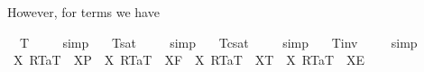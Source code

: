 \begin{isabellebody}
%
\endisadelimproof
%
\begin{isamarkuptext}%
However, for terms we have%
\end{isamarkuptext}%
\isamarkuptrue%
\isamarkupfalse%
\ \ {\isachardoublequoteopen}{\isacharbrackleft}{\isasymphi}\isactrlsup T{\isacharbrackright}\ {\isacharequal}\ {\isacharasterisk}{\isachardoublequoteclose}%
\isadelimproof
\ %
\endisadelimproof
%
\isatagproof
{}\isamarkupfalse%
\ simp\ \isamarkupfalse%
%
\endisatagproof
{\isafoldproof}%
%
\isadelimproof
%
\endisadelimproof
\isanewline
{}\isamarkupfalse%
\ \ {\isachardoublequoteopen}{\isacharbrackleft}{\isasymphi}\isactrlsup T{\isacharbrackright}\isactrlsup s\isactrlsup a\isactrlsup t\ {\isacharequal}\ {\isacharasterisk}{\isachardoublequoteclose}%
\isadelimproof
\ %
\endisadelimproof
%
\isatagproof
{}\isamarkupfalse%
\ simp\ \isamarkupfalse%
%
\endisatagproof
{\isafoldproof}%
%
\isadelimproof
%
\endisadelimproof
\isanewline
{}\isamarkupfalse%
\ \ {\isachardoublequoteopen}{\isacharbrackleft}{\isasymphi}\isactrlsup T{\isacharbrackright}\isactrlsup c\isactrlsup s\isactrlsup a\isactrlsup t\ {\isacharequal}\ {\isacharasterisk}{\isachardoublequoteclose}%
\isadelimproof
\ %
\endisadelimproof
%
\isatagproof
{}\isamarkupfalse%
\ simp\ \isamarkupfalse%
%
\endisatagproof
{\isafoldproof}%
%
\isadelimproof
%
\endisadelimproof
\isanewline
{}\isamarkupfalse%
\ \ {\isachardoublequoteopen}{\isacharbrackleft}{\isasymphi}\isactrlsup T{\isacharbrackright}\isactrlsup i\isactrlsup n\isactrlsup v\ {\isacharequal}\ {\isacharasterisk}{\isachardoublequoteclose}%
\isadelimproof
\ %
\endisadelimproof
%
\isatagproof
{}\isamarkupfalse%
\ simp\ \isamarkupfalse%
%
\endisatagproof
{\isafoldproof}%
%
\isadelimproof
%
\endisadelimproof
%
\isamarkuptrue%
\isamarkupfalse%
\ {\isachardoublequoteopen}{\isasymexists}X{\isachardot}\ {\isasymlparr}R\isactrlsup T{\isacharcomma}a\isactrlsup T{\isasymrparr}\ {\isacharequal}\ {\isacharparenleft}X\isactrlsup P{\isacharparenright}\ {\isasymand}\ {\isasymnot}{\isacharparenleft}{\isasymexists}X{\isachardot}\ {\isasymlparr}R\isactrlsup T{\isacharcomma}a\isactrlsup T{\isasymrparr}\ {\isacharequal}\ {\isacharparenleft}X\isactrlsup F{\isacharparenright}{\isacharparenright}\ {\isasymand}\ {\isasymnot}{\isacharparenleft}{\isasymexists}X{\isachardot}\ {\isasymlparr}R\isactrlsup T{\isacharcomma}a\isactrlsup T{\isasymrparr}\ {\isacharequal}\ {\isacharparenleft}X\isactrlsup T{\isacharparenright}{\isacharparenright}\ {\isasymand}\ {\isasymnot}{\isacharparenleft}{\isasymexists}X{\isachardot}\ {\isasymlparr}R\isactrlsup T{\isacharcomma}a\isactrlsup T{\isasymrparr}\ {\isacharequal}\ {\isacharparenleft}X\isactrlsup E{\isacharparenright}{\isacharparenright}{\isachardoublequoteclose}%

\end{isabellebody}
